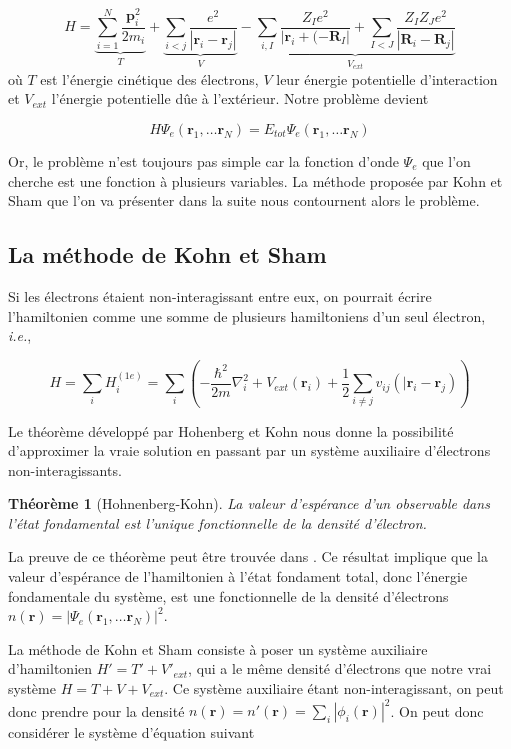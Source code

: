 \documentclass[12pt]{report}
\theoremstyle{theoreme}
\newtheorem{theoreme}{Théorème}
\begin{document}
$$
H = \underbrace{\sum_{i=1}^N \frac{\textbf{p}_i^2}{2m_i}}_{T}
+ \underbrace{\sum_{i<j}\frac{e^2}{| \textbf{r}_i - \textbf{r}_j |}}_{V} 
- \underbrace{\sum_{i, I}\frac{Z_I e^2}{| \textbf{r}_i +(- \textbf{R}_I |} + \sum_{I<J}\frac{Z_I Z_J e^2}{| \textbf{R}_i - \textbf{R}_j |}}_{V_{ext}}
$$ 
où $T$ est l'énergie cinétique des électrons, $V$ leur énergie potentielle d'interaction et $V_{ext}$ l'énergie potentielle dûe à l'extérieur. 
Notre problème devient 

$$
H \Psi_e(\textbf{r}_1, \ldots \textbf{r}_N) = E_{tot} \Psi_e(\textbf{r}_1, \ldots \textbf{r}_N)
$$

Or, le problème n'est toujours pas simple car la fonction d'onde $\Psi_e$ que l'on cherche est une fonction à plusieurs variables. La méthode proposée par Kohn et Sham \cite{Koh65} que l'on va présenter dans la suite nous contournent alors le problème.

\subsection{La méthode de Kohn et Sham}
Si les électrons étaient non-interagissant entre eux, on pourrait écrire l'hamiltonien comme une somme de plusieurs hamiltoniens d'un seul électron, \textit{i.e.},

$$
H = \sum_i H_i^{(1e)} = \sum_i (-\frac{\hbar^2}{2m}\nabla_i^2 + V_{ext}(\textbf{r}_i) + \frac{1}{2}\sum_{i \neq j} v_{ij}(|\textbf{r}_i - \textbf{r}_j))
$$

Le théorème développé par Hohenberg et Kohn \cite{Hoh64} nous donne la possibilité d'approximer la vraie solution en passant par un système auxiliaire d'électrons non-interagissants.

\begin{theoreme}[Hohnenberg-Kohn]
La valeur d'espérance d'un observable dans l'état fondamental est l'unique fonctionnelle de la densité d'électron. 
\end{theoreme}

La preuve de ce théorème peut être trouvée dans \cite{Sot03}. 
Ce résultat implique que la valeur d'espérance de l'hamiltonien à l'état fondament total, donc l'énergie fondamentale du système, est une fonctionnelle de la densité d'électrons $n(\textbf{r}) = |\Psi_e(\textbf{r}_1, \ldots \textbf{r}_N) |^2$.

La méthode de Kohn et Sham consiste à poser un système auxiliaire d'hamiltonien $H' = T' + V'_{ext}$, qui a le même densité d'électrons que notre vrai système $H = T + V + V_{ext}$. Ce système auxiliaire étant non-interagissant, on peut donc prendre pour la densité $n(\textbf{r}) = n'(\textbf{r}) = \sum_i |\phi_i(\textbf{r})|^2$. On peut donc considérer le système d'équation suivant
\end{document}
